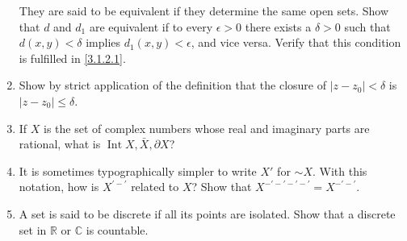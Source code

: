 \begin{enumerate}[ref = \theenumi{}]
  They are said to be equivalent if they determine the same open sets.
  Show that \(d\) and \(d_1\) are equivalent if to every \(\epsilon > 0\) there
  exists a \(\delta > 0\) such that \(d(x,y) < \delta\) implies
  \(d_1(x,y) < \epsilon\), and vice versa.
  Verify that this condition is fulfilled in \cref{3.1.2.1}.
\item
  Show by strict application of the definition that the closure of
  \(\lvert z - z_0\rvert < \delta\) is \(\lvert z - z_0\rvert\leq\delta\).
\item
  If \(X\) is the set of complex numbers whose real and imaginary parts are
  rational, what is \(\operatorname{Int} X, \bar{X}, \partial X\)?
\item
  It is sometimes typographically simpler to write \(X'\) for \(\sim X\).
  With this notation, how is \(X^{'-'}\) related to \(X\)?
  Show that \(X^{-'-'-'-'} = X^{-'-'}\).
\item
  A set is said to be discrete if all its points are isolated.
  Show that a discrete set in \(\mathbb{R}\) or \(\mathbb{C}\) is countable.
\end{enumerate}
